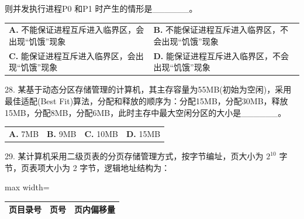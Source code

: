\documentclass[UTF8,11pt]{ctexart}
\begin{document}
则并发执行进程P0 和P1 时产生的情形是\_\_\_\_\_\_。


\begin{center}\begin{tabular}{>{\raggedright\arraybackslash}p{\dimexpr(\linewidth-4\tabcolsep)/2\relax}>{\raggedright\arraybackslash}p{\dimexpr(\linewidth-4\tabcolsep)/2\relax}}
\textbf{A.} 不能保证进程互斥进入临界区，会出现“饥饿”现象 & \textbf{B.} 不能保证进程互斥进入临界区，不会出现“饥饿”现象\\[.35em]
\textbf{C.} 能保证进程互斥进入临界区，会出现“饥饿”现象 & \textbf{D.} 能保证进程互斥进入临界区，不会出现“饥饿”现象\\[.35em]\end{tabular}\end{center}

28. 某基于动态分区存储管理的计算机，其主存容量为55MB(初始为空闲)，采用最佳适配(Best Fit)算法，分配和释放的顺序为：分配15MB，分配30MB，释放15MB，分配8MB，分配6MB，此时主存中最大空闲分区的大小是\_\_\_\_\_\_。


\begin{center}\begin{tabular}{>{\raggedright\arraybackslash}p{\dimexpr(\linewidth-8\tabcolsep)/4\relax}>{\raggedright\arraybackslash}p{\dimexpr(\linewidth-8\tabcolsep)/4\relax}>{\raggedright\arraybackslash}p{\dimexpr(\linewidth-8\tabcolsep)/4\relax}>{\raggedright\arraybackslash}p{\dimexpr(\linewidth-8\tabcolsep)/4\relax}}
\textbf{A.} 7MB & \textbf{B.} 9MB & \textbf{C.} 10MB & \textbf{D.} 15MB\\[.35em]\end{tabular}\end{center}

29. 某计算机采用二级页表的分页存储管理方式，按字节编址，页大小为 \(\displaystyle 2^{10}\) 字节，页表项大小为 2 字节，逻辑地址结构为：


\begin{center}\begin{adjustbox}{max width=\linewidth}\begin{tabular}{|>{\raggedright\arraybackslash}p{\dimexpr(\linewidth-6\tabcolsep-4\arrayrulewidth)/3\relax}|>{\raggedright\arraybackslash}p{\dimexpr(\linewidth-6\tabcolsep-4\arrayrulewidth)/3\relax}|>{\raggedright\arraybackslash}p{\dimexpr(\linewidth-6\tabcolsep-4\arrayrulewidth)/3\relax}|}\hline
页目录号 & 页号 & 页内偏移量\\\hline\end{tabular}\end{adjustbox}\end{center}
\end{document}

